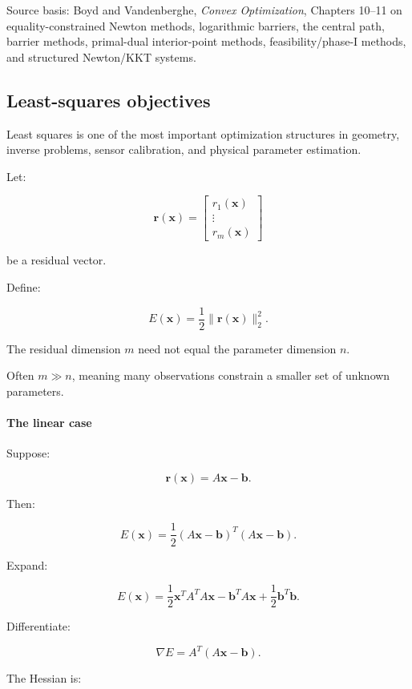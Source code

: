 Source basis: Boyd and Vandenberghe, \emph{Convex Optimization}, Chapters 10--11 on equality-constrained Newton methods, logarithmic barriers, the central path, barrier methods, primal-dual interior-point methods, feasibility/phase-I methods, and structured Newton/KKT systems.

\subsection{Least-squares objectives}\label{02-foundations-ii-ch026-least-squares-objectives}

Least squares is one of the most important optimization structures in geometry, inverse problems, sensor calibration, and physical parameter estimation.

Let:

\[
\mathbf r(\mathbf x)= \begin{bmatrix} r_1(\mathbf x)\\ \vdots\\ r_m(\mathbf x) \end{bmatrix}
\]

be a residual vector.

Define:

\[
\boxed{ E(\mathbf x)=\frac12\|\mathbf r(\mathbf x)\|_2^2 }.
\]

The residual dimension \(m\) need not equal the parameter dimension \(n\).

Often \(m\gg n\), meaning many observations constrain a smaller set of unknown parameters.

\paragraph{The linear case}\label{02-foundations-ii-ch026-the-linear-case}

Suppose:

\[
\mathbf r(\mathbf x)=A\mathbf x-\mathbf b.
\]

Then:

\[
E(\mathbf x)= \frac12(A\mathbf x-\mathbf b)^T(A\mathbf x-\mathbf b).
\]

Expand:

\[
E(\mathbf x) = \frac12\mathbf x^TA^TA\mathbf x -\mathbf b^TA\mathbf x +\frac12\mathbf b^T\mathbf b.
\]

Differentiate:

\[
\boxed{ \nabla E=A^T(A\mathbf x-\mathbf b) }.
\]

The Hessian is:

